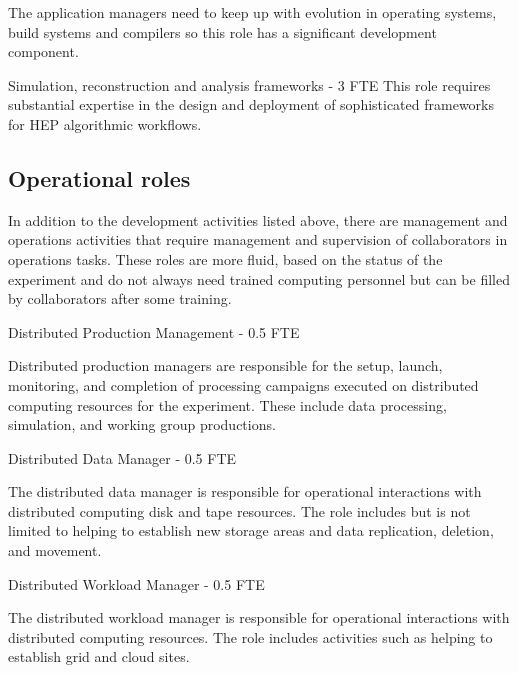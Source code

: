 \documentclass[../main-v1.tex]{subfiles}
\begin{document}
\begin{description}
The application managers need to keep up with evolution in operating systems, build systems and compilers so this role has a significant development component.

\item{Simulation, reconstruction and analysis frameworks - 3 FTE}
This role requires substantial expertise in the design and deployment of sophisticated frameworks for HEP algorithmic workflows. 


\subsection{Operational  roles}

In addition to the development activities listed above, there are management and operations activities that require management and supervision of collaborators in operations tasks.   These roles are more fluid, based on the status of the experiment and do not always need trained computing personnel but can be filled by collaborators after some training. 


\item {Distributed Production Management - 0.5 FTE}

Distributed production managers are responsible for the setup, launch, monitoring, and %
completion of processing campaigns executed on distributed computing resources for the experiment. %
These include data processing,  simulation, and working group productions. 


\item {Distributed Data Manager - 0.5 FTE}

The distributed data manager is responsible for operational interactions with distributed computing disk and tape resources. The role includes but is not limited to helping to establish new storage areas and data replication, deletion, and movement. 

\item {Distributed Workload Manager - 0.5 FTE}

The distributed workload manager is responsible for operational interactions with distributed computing resources. The role includes activities such as helping to establish grid and cloud sites. 



\end{description}
\end{document}

